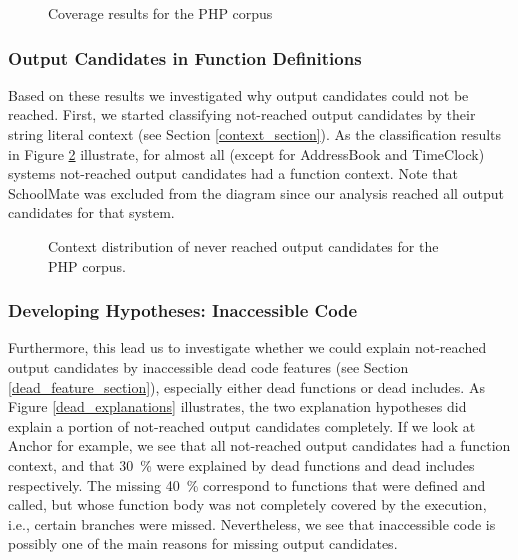 \documentclass{sig-alternate-05-2015}
\begin{document}
\begin{figure}
	\centering	
	\resizebox{0.4\textwidth}{!}{%
			
	}
	\caption{Coverage results for the PHP corpus}
	\label{coverage}
\end{figure}

\subsubsection{Output Candidates in Function Definitions}
Based on these results we investigated why output candidates could not be reached. First, we started classifying not-reached output candidates by their string literal context (see Section \ref{context_section}). As the classification results in Figure \ref{contexts} illustrate, for almost all (except for AddressBook and TimeClock) systems not-reached output candidates had a function context. Note that SchoolMate was excluded from the diagram since our analysis reached all output candidates for that system.

\begin{figure}
	\resizebox{0.4\textwidth}{!}{%
		
	}	
	\caption{Context distribution of never reached output candidates for the PHP
	corpus.}
	\label{contexts}
\end{figure}

\subsubsection{Developing Hypotheses: Inaccessible Code}
Furthermore, this lead us to investigate whether we could explain not-reached output candidates by inaccessible dead code features (see Section \ref{dead_feature_section}), especially either dead functions or dead includes. As Figure \ref{dead_explanations} illustrates, the two explanation hypotheses did explain a portion of not-reached output candidates completely. If we look at Anchor for example, we see that all not-reached output candidates had a function context, and that 30~\% were explained by dead functions and dead includes respectively. The missing 40~\% correspond to functions that were defined and called, but whose function body was not completely covered by the execution, i.e., certain branches were missed.
Nevertheless, we see that inaccessible code is possibly one of the main reasons for missing output candidates. 
\end{document}
